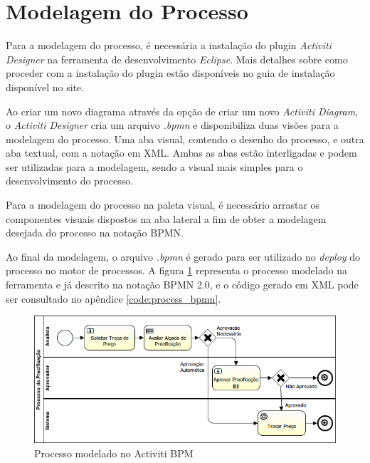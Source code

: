 \section{Modelagem do Processo}\label{sec:automatizacao_processos-modelagem_processo}

Para a modelagem do processo, é necessária a instalação do plugin \textit{Activiti Designer} na ferramenta de desenvolvimento \textit{Eclipse}\cite{eclipse}. Mais detalhes sobre como proceder com a instalação do plugin estão disponíveis no guia de instalação disponível no site\cite{activiti_designer}.

Ao criar um novo diagrama através da opção de criar um novo \textit{Activiti Diagram}, o \textit{Activiti Designer} cria um arquivo \textit{.bpmn} e disponibiliza duas visões para a modelagem do processo. Uma aba visual, contendo o desenho do processo, e outra aba textual, com a notação em XML. Ambas as abas estão interligadas e podem ser utilizadas para a modelagem, sendo a visual mais simples para o desenvolvimento do processo.

Para a modelagem do processo na paleta visual, é necessário arrastar os componentes visuais dispostos na aba lateral a fim de obter a modelagem desejada do processo na notação BPMN.

Ao final da modelagem, o arquivo \textit{.bpmn} é gerado para ser utilizado no \textit{deploy} do processo no motor de processos. A figura \ref{fig:processo_precificacao} representa o processo modelado na ferramenta e já descrito na notação BPMN 2.0, e o código gerado em XML pode ser consultado no apêndice \ref{code:process_bpmn}.

\begin{figure}[H]
\centering
\includegraphics[width=1.0\textwidth]{imagens/ProcessoDePrecificacao}
\caption{Processo modelado no Activiti BPM}
\label{fig:processo_precificacao}
\end{figure}
